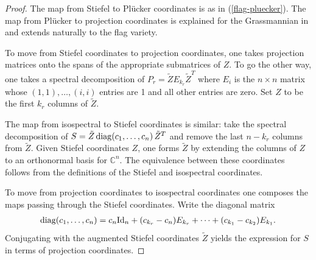 \documentclass[12pt]{extarticle}
\theoremstyle{definition}
\numberwithin{theorem}{section}
\newcommand{\CC}{\mathbb{C}}
\begin{document}
\begin{proof}
The map from Stiefel to Pl\"ucker coordinates  is as in (\ref{flag-pluecker}).
The map from Pl\"{u}cker to projection coordinates is explained for the Grassmannian in \cite[Corollary 2.5]{DFRS} and extends naturally to the flag variety. 

To move from Stiefel coordinates to projection coordinates, one takes projection matrices onto the spans of the appropriate submatrices of $Z$. 
To go the other way, one takes a spectral decomposition of $P_r = \tilde{Z} E_{k_r} \tilde{Z}^T$ where $E_{i}$ is  the $n \times n$ matrix whose $(1,1), \ldots, (i,i)$ entries are 1 and all other entries are zero. Set $Z$ to be the first $k_r$ columns of $ {\tilde Z}$.

The map from isospectral to Stiefel coordinates is similar: take the spectral decomposition of $S = \tilde{Z}\,{\rm diag}(c_1, \ldots, c_n)\, \tilde{Z}^T$ and remove the last $n - k_r$ columns from $\tilde{Z}$.
Given Stiefel coordinates $Z$, one forms $\tilde{Z}$ by extending the columns of $Z$ to an orthonormal basis for $\CC^n$. 
The equivalence between these coordinates follows from the definitions of the Stiefel and isospectral coordinates. 

To move from projection coordinates to isospectral coordinates one composes the maps passing through the Stiefel coordinates. 
Write the diagonal matrix 
\begin{align*}
    {\rm diag}(c_1, \ldots, c_n) = c_n {\rm Id}_n + (c_{k_r} - c_n) E_{k_r} + \cdots + (c_{k_1} - c_{k_2})E_{k_1}.
\end{align*}
Conjugating with the augmented Stiefel coordinates $\tilde{Z}$ yields the expression for $S$ in terms of projection coordinates.
\end{proof}
\end{document}
